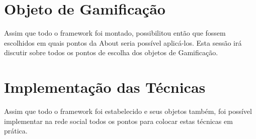 \section{Objeto de Gamificação}
\label{sec:gamifição}
Assim que todo o framework foi montado, possibilitou então que fossem escolhidos em quais
pontos da About seria possível aplicá-los. Esta sessão irá discutir sobre todos os pontos de escolha
dos objetos de Gamificação.

\section{Implementação das Técnicas}
\label{sec:gamifição}
Assim que todo o framework foi estabelecido e seus objetos também, foi possível implementar
na rede social todos os pontos para colocar estas técnicas em prática.

